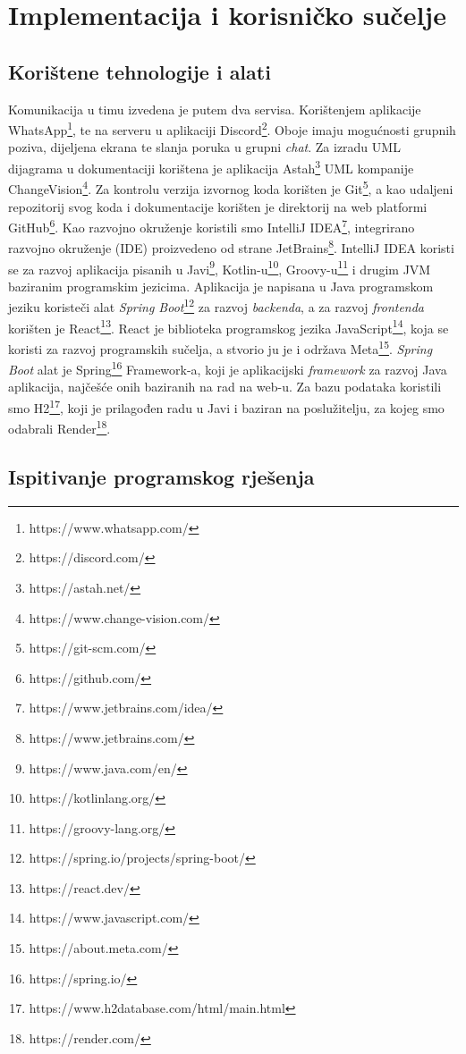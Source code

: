 \chapter{Implementacija i korisničko sučelje}
		
		
		\section{Korištene tehnologije i alati}
		
			Komunikacija u timu izvedena je putem dva servisa. Korištenjem aplikacije WhatsApp\footnote{https://www.whatsapp.com/}, te na serveru u aplikaciji Discord\footnote{https://discord.com/}. Oboje imaju mogućnosti grupnih poziva, dijeljena ekrana te slanja poruka u grupni \textit{chat}. 
			Za izradu UML dijagrama u dokumentaciji korištena je aplikacija Astah\footnote{https://astah.net/} UML kompanije ChangeVision\footnote{https://www.change-vision.com/}. Za kontrolu verzija izvornog koda korišten je Git\footnote{https://git-scm.com/}, a kao udaljeni repozitorij svog koda i dokumentacije korišten je direktorij na web platformi GitHub\footnote{https://github.com/}.
			Kao razvojno okruženje koristili smo IntelliJ IDEA\footnote{https://www.jetbrains.com/idea/}, integrirano razvojno okruženje (IDE) proizvedeno od strane JetBrains\footnote{https://www.jetbrains.com/}. IntelliJ IDEA koristi se za razvoj aplikacija pisanih u Javi\footnote{https://www.java.com/en/}, Kotlin-u\footnote{https://kotlinlang.org/}, Groovy-u\footnote{https://groovy-lang.org/} i drugim JVM baziranim programskim jezicima.
			Aplikacija je napisana u Java programskom jeziku koristeči alat \textit{Spring Boot}\footnote{https://spring.io/projects/spring-boot/} za razvoj \textit{backenda}, a za razvoj \textit{frontenda} korišten je React\footnote{https://react.dev/}. React je biblioteka programskog jezika JavaScript\footnote{https://www.javascript.com/}, koja se koristi za razvoj programskih sučelja, a stvorio ju je i održava Meta\footnote{https://about.meta.com/}. \textit{Spring Boot} alat je Spring\footnote{https://spring.io/} Framework-a, koji je aplikacijski \textit{framework} za razvoj Java aplikacija, najčešće onih baziranih na rad na web-u.
			Za bazu podataka koristili smo H2\footnote{https://www.h2database.com/html/main.html}, koji je prilagođen radu u Javi i baziran na poslužitelju, za kojeg smo odabrali Render\footnote{https://render.com/}.
			
			\eject 
		
	
		\section{Ispitivanje programskog rješenja}
			
